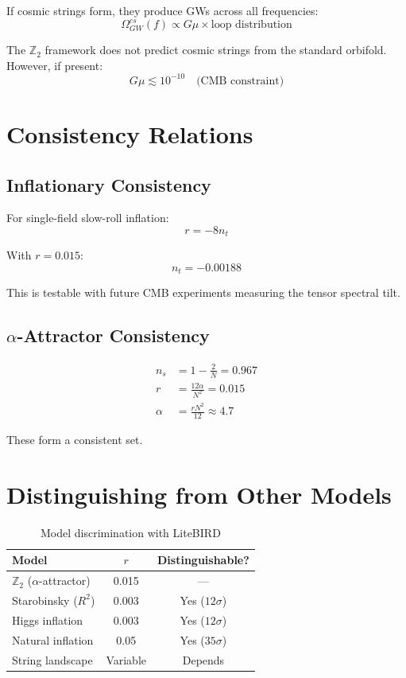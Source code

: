 \documentclass[12pt,a4paper]{article}
\begin{document}
If cosmic strings form, they produce GWs across all frequencies:
\begin{equation}
\Omega_{GW}^{cs}(f) \propto G\mu \times \text{loop distribution}
\end{equation}

The $\mathbb{Z}_2$ framework does not predict cosmic strings from the standard orbifold. However, if present:
\begin{equation}
G\mu \lesssim 10^{-10} \quad \text{(CMB constraint)}
\end{equation}

\section{Consistency Relations}

\subsection{Inflationary Consistency}

For single-field slow-roll inflation:
\begin{equation}
r = -8 n_t
\end{equation}

With $r = 0.015$:
\begin{equation}
n_t = -0.00188
\end{equation}

This is testable with future CMB experiments measuring the tensor spectral tilt.

\subsection{$\alpha$-Attractor Consistency}

\begin{align}
n_s &= 1 - \frac{2}{N} = 0.967 \\
r &= \frac{12\alpha}{N^2} = 0.015 \\
\alpha &= \frac{rN^2}{12} \approx 4.7
\end{align}

These form a consistent set.

\section{Distinguishing from Other Models}

\begin{table}[h]
\centering
\begin{tabular}{lcc}
\toprule
Model & $r$ & Distinguishable? \\
\midrule
$\mathbb{Z}_2$ ($\alpha$-attractor) & 0.015 & --- \\
Starobinsky ($R^2$) & 0.003 & Yes ($12\sigma$) \\
Higgs inflation & 0.003 & Yes ($12\sigma$) \\
Natural inflation & 0.05 & Yes ($35\sigma$) \\
String landscape & Variable & Depends \\
\bottomrule
\end{tabular}
\caption{Model discrimination with LiteBIRD}
\end{table}
\end{document}
